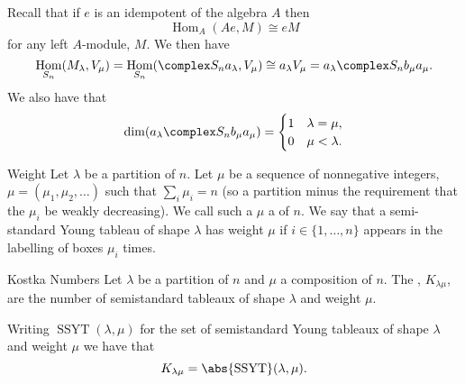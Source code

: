 \documentclass[fleqn]{NotesClass}
\DeclareMathOperator{\Hom}{Hom}
\newcommand{\isomorphic}{\cong}
\DeclareMathOperator{\semistandardYoungTableaux}{SSYT}
\begin{document}
    Recall that if \(e\) is an idempotent of the algebra \(A\) then
    \begin{equation}
        \Hom_A(Ae, M) \isomorphic eM
    \end{equation}
    for any left \(A\)-module, \(M\).
    We then have
    \begin{equation}
        \Hom_{S_n}(M_\lambda, V_\mu) = \Hom_{S_n}(\complex S_n a_\lambda, V_\mu) \isomorphic a_\lambda V_\mu = a_\lambda \complex S_n b_\mu a_\mu.
    \end{equation}
    We also have that
    \begin{equation}
        \dim(a_\lambda \complex S_n b_\mu a_\mu) = 
        \begin{cases}
            1 & \lambda = \mu,\\
            0 & \mu < \lambda.
        \end{cases}
    \end{equation}
    
    \begin{dfn}{Weight}{}
        Let \(\lambda\) be a partition of \(n\).
        Let \(\mu\) be a sequence of nonnegative integers, \(\mu = (\mu_1, \mu_2, \dotsc)\) such that \(\sum_i \mu_i = n\) (so a partition minus the requirement that the \(\mu_i\) be weakly decreasing).
        We call such a \(\mu\) a  of \(n\).
        We say that a semi-standard Young tableau of shape \(\lambda\) has weight \(\mu\) if \(i \in \{1, \dotsc, n\}\) appears in the labelling of boxes \(\mu_i\) times.
    \end{dfn}
    
    \begin{dfn}{Kostka Numbers}{}
        Let \(\lambda\) be a partition of \(n\) and \(\mu\) a composition of \(n\).
        The , \(K_{\lambda\mu}\), are the number of semistandard tableaux of shape \(\lambda\) and weight \(\mu\).
    \end{dfn}
    
    Writing \(\semistandardYoungTableaux(\lambda, \mu)\) for the set of semistandard Young tableaux of shape \(\lambda\) and weight \(\mu\) we have that
    \begin{equation}
        K_{\lambda\mu} = \abs{\semistandardYoungTableaux}(\lambda, \mu).
    \end{equation}
    
\end{document}
